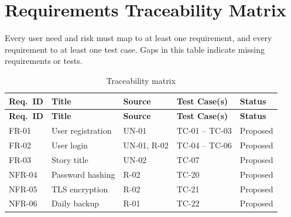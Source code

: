 \chapter{Requirements Traceability Matrix}\label{app:trace}
\begin{guidance}
Every user need and risk must map to at least one requirement, and every requirement to at least one test case. Gaps in this table indicate missing requirements or tests.
\end{guidance}

\begin{longtable}{|L{1.8cm}|L{4.0cm}|L{2.4cm}|L{2.4cm}|L{2.0cm}|}
\caption{Traceability matrix}\label{tab:trace}\\
\hline
{}\sffamily\bfseries Req.\ ID & \sffamily\bfseries Title & \sffamily\bfseries Source & \sffamily\bfseries Test Case(s) & \sffamily\bfseries Status \\ \hline
\endfirsthead
\hline
{}\sffamily\bfseries Req.\ ID & \sffamily\bfseries Title & \sffamily\bfseries Source & \sffamily\bfseries Test Case(s) & \sffamily\bfseries Status \\ \hline
\endhead
FR-01  & User registration & UN-01       & TC-01 -- TC-03 & Proposed \\ \hline
FR-02  & User login        & UN-01, R-02 & TC-04 -- TC-06 & Proposed \\ \hline
FR-03  & Story title       & UN-02       & TC-07          & Proposed \\ \hline
NFR-04 & Password hashing  & R-02        & TC-20          & Proposed \\ \hline
NFR-05 & TLS encryption    & R-02        & TC-21          & Proposed \\ \hline
NFR-06 & Daily backup      & R-01        & TC-22          & Proposed \\ \hline
\end{longtable}

